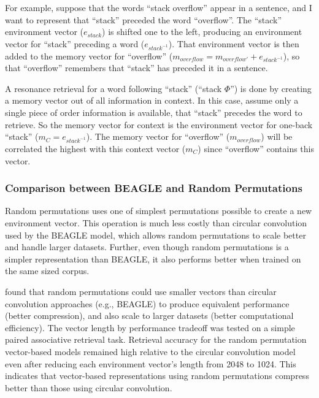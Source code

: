 \documentclass[man,floatsintext,donotrepeattitle]{apa6}
\begin{document}
For example, suppose that the words ``stack overflow'' appear in a sentence, and I want to represent that ``stack'' preceded the word ``overflow''.
The ``stack'' environment vector ($e_{stack}$) is shifted one to the left, producing an environment vector for ``stack'' preceding a word ($e_{stack^{-1}}$).
That environment vector is then added to the memory vector for ``overflow'' ($m_{overflow} = m_{overflow'} + e_{stack^{-1}}$), so that ``overflow'' remembers that ``stack'' has preceded it in a sentence.

A resonance retrieval for a word following ``stack'' (``stack $\Phi$'') is done by creating a memory vector out of all information in context.
In this case, assume only a single piece of order information is available, that ``stack'' precedes the word to retrieve.
So the memory vector for context is the environment vector for one-back ``stack'' ($m_{C} = e_{stack^{-1}}$).
The memory vector for ``overflow'' ($m_{overflow}$) will be correlated the highest with this context vector ($m_{C}$) since ``overflow'' contains this vector.

\subsubsection{Comparison between BEAGLE and Random Permutations}

Random permutations uses one of simplest permutations possible to create a new environment vector.
This operation is much less costly than circular convolution used by the BEAGLE model, which allows random permutations to scale better and handle larger datasets.
Further, even though random permutations is a simpler representation than BEAGLE, it also performs better when trained on the same sized corpus. 

\textcite{Recchia2010} found that random permutations could use smaller vectors than circular convolution approaches (e.g., BEAGLE) to produce equivalent performance (better compression),
and also scale to larger datasets (better computational efficiency).
The vector length by performance tradeoff was tested on a simple paired associative retrieval task. 
Retrieval accuracy for the random permutation vector-based models remained high relative to the circular convolution model even after reducing each environment vector's length from \num{2048} to \num{1024}.
This indicates that vector-based representations using random permutations compress better than those using circular convolution.
\end{document}
